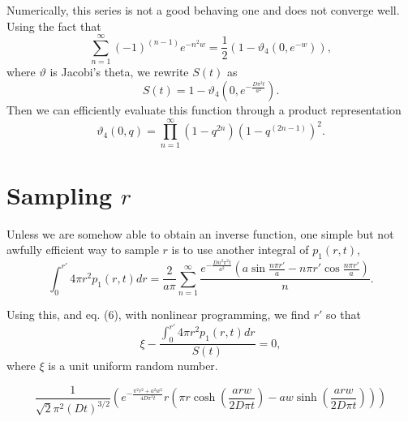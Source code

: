 \documentclass{article}
\begin{document}
Numerically, this series is not a good behaving one and does not converge well.
Using the fact that
\begin{equation}
\sum_{n=1}^{\infty} (-1)^{(n-1)} e^{- n^2 w} = 
\frac{1}{2} ( 1 - \vartheta_4( 0, e^{-w} ) ),
\end{equation}
where $\vartheta$ is Jacobi's theta, we rewrite $S(t)$ as 
\begin{equation}
S(t) = 1 - \vartheta_4( 0, e^{- \frac{D \pi^2 t}{a^2}} ).
\end{equation}
Then we can efficiently evaluate this function through a product 
representation
\begin{equation}
\vartheta_4( 0, q ) = \prod_{n=1}^{\infty} (1-q^{2n})(1-q^{(2n-1)})^2.
\end{equation}

\section{Sampling $r$}

Unless we are somehow able to obtain an inverse function, one
simple but not awfully efficient way to sample $r$ is to use another
integral of $p_1(r,t)$,
\begin{equation}
\int_{0}^{r'} 4 \pi r^2 p_1(r,t) dr = \frac{2}{a \pi} 
\sum_{n=1}^{\infty} \frac{e^{- \frac{D n^2 \pi^2 t}{a^2}}
\left( a \sin \frac{n \pi r'}{a} - n \pi r' \cos \frac{n \pi r'}{a} \right)}
{n}.
\end{equation}

Using this, and eq. (6), with nonlinear programming, we find $r'$ so that
\begin{equation}
\xi - \frac{\int_{0}^{r'} 4 \pi r^2 p_1(r,t) dr}{S(t)} = 0,
\end{equation}
where $\xi$ is a unit uniform random number.


\begin{equation}
\frac{1}{\sqrt{2} \pi ^2 (D t)^{3/2}} \left( e^{-\frac{\pi ^2 r^2+a^2 w^2}{4
   D \pi ^2 t}} r \left(\pi  r \cosh \left(\frac{a r w}{2
   D \pi  t}\right)-a w \sinh \left(\frac{a r w}{2 D \pi 
   t}\right)\right) \right)
\end{equation}
\end{document}
